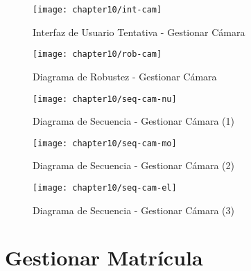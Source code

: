       \begin{figure}[H]
        \centering
        \texttt{[image: chapter10/int-cam]}
        \caption{Interfaz de Usuario Tentativa - Gestionar Cámara}
        \label{fig:int-cam}
    \end{figure}
    
\begin{landscape}
    \begin{figure}[H]
        \centering
        \texttt{[image: chapter10/rob-cam]}
        \caption{Diagrama de Robustez - Gestionar Cámara }
        \label{fig:rob-cam}
    \end{figure}
  
    \begin{figure}[H]
        \centering
        \texttt{[image: chapter10/seq-cam-nu]}
        \caption{Diagrama de Secuencia - Gestionar Cámara (1) }
        \label{fig:seq-cam-nu}
    \end{figure}
    
    \begin{figure}[H]
        \centering
        \texttt{[image: chapter10/seq-cam-mo]}
        \caption{Diagrama de Secuencia - Gestionar Cámara (2) }
        \label{fig:seq-cam-mo}
    \end{figure}
    
    \begin{figure}[H]
        \centering
        \texttt{[image: chapter10/seq-cam-el]}
        \caption{Diagrama de Secuencia - Gestionar Cámara (3) }
        \label{fig:seq-cam-el}
    \end{figure}
    \end{landscape}

\section{Gestionar Matrícula}

